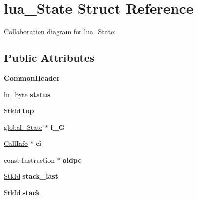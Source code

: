 \hypertarget{structlua___state}{\section{lua\+\_\+\+State Struct Reference}
\label{structlua___state}
}


Collaboration diagram for lua\+\_\+\+State\+:
\subsection*{Public Attributes}
\begin{DoxyCompactItemize}
\item 
\hypertarget{structlua___state_ad5311df12c1bfa3c4e11b7a1dbecaeda}{{\bfseries Common\+Header}}\label{structlua___state_ad5311df12c1bfa3c4e11b7a1dbecaeda}

\item 
\hypertarget{structlua___state_a563f8f114867e0b03405680633672102}{lu\+\_\+byte {\bfseries status}}\label{structlua___state_a563f8f114867e0b03405680633672102}

\item 
\hypertarget{structlua___state_a195f448e76fd404953fa1962d28212a3}{\hyperlink{structlua___t_value}{Stk\+Id} {\bfseries top}}\label{structlua___state_a195f448e76fd404953fa1962d28212a3}

\item 
\hypertarget{structlua___state_a63c9e91949432bcef6251366fbac6c9e}{\hyperlink{structglobal___state}{global\+\_\+\+State} $\ast$ {\bfseries l\+\_\+\+G}}\label{structlua___state_a63c9e91949432bcef6251366fbac6c9e}

\item 
\hypertarget{structlua___state_a7fbb5727050853f411ad64b4be9ab5c8}{\hyperlink{struct_call_info}{Call\+Info} $\ast$ {\bfseries ci}}\label{structlua___state_a7fbb5727050853f411ad64b4be9ab5c8}

\item 
\hypertarget{structlua___state_a432a65b4dfa167b9e80ca0abe1fc119e}{const Instruction $\ast$ {\bfseries oldpc}}\label{structlua___state_a432a65b4dfa167b9e80ca0abe1fc119e}

\item 
\hypertarget{structlua___state_a797a585a2bdb638bd1ca78c15bbe46fb}{\hyperlink{structlua___t_value}{Stk\+Id} {\bfseries stack\+\_\+last}}\label{structlua___state_a797a585a2bdb638bd1ca78c15bbe46fb}

\item 
\hypertarget{structlua___state_a27e1d5122ef7fffae7542814c72fdd2f}{\hyperlink{structlua___t_value}{Stk\+Id} {\bfseries stack}}\label{structlua___state_a27e1d5122ef7fffae7542814c72fdd2f}


\end{DoxyCompactItemize}
